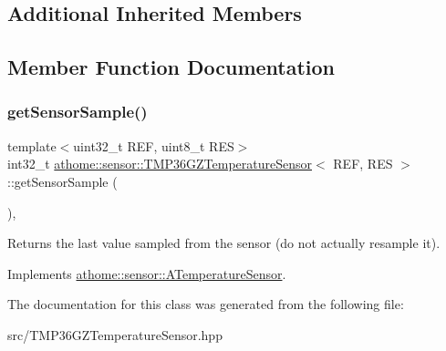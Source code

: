 \subsection*{Additional Inherited Members}


\subsection{Member Function Documentation}
\mbox{\label{classathome_1_1sensor_1_1_t_m_p36_g_z_temperature_sensor_ae0e101ee54c5c64842d2cab9fb9292f4}} 
\subsubsection{\texorpdfstring{get\+Sensor\+Sample()}{getSensorSample()}}
{\footnotesize\ttfamily template$<$uint32\+\_\+t R\+EF, uint8\+\_\+t R\+ES$>$ \\
int32\+\_\+t \mbox{\hyperlink{classathome_1_1sensor_1_1_t_m_p36_g_z_temperature_sensor}{athome\+::sensor\+::\+T\+M\+P36\+G\+Z\+Temperature\+Sensor}}$<$ R\+EF, R\+ES $>$\+::get\+Sensor\+Sample (\begin{DoxyParamCaption}{ }\end{DoxyParamCaption})\hspace{0.3cm}{\ttfamily [inline]}, {\ttfamily [virtual]}}

Returns the last value sampled from the sensor (do not actually resample it). 

Implements \mbox{\hyperlink{classathome_1_1sensor_1_1_a_temperature_sensor_a4e5b2c79ab69f6903f7b322da45b0af4}{athome\+::sensor\+::\+A\+Temperature\+Sensor}}.



The documentation for this class was generated from the following file\+:\begin{DoxyCompactItemize}
\item 
src/T\+M\+P36\+G\+Z\+Temperature\+Sensor.\+hpp\end{DoxyCompactItemize}
